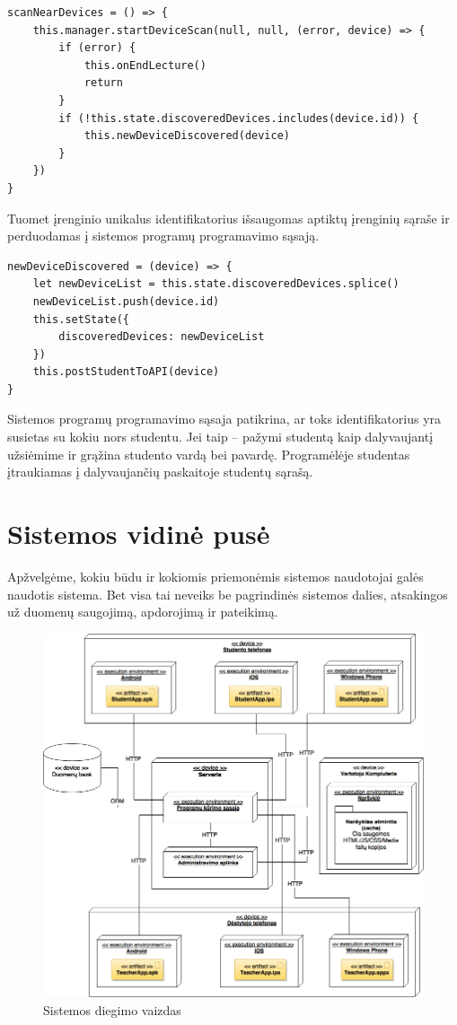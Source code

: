 \documentclass{VUMIFPSbakalaurinis}
\begin{document}
\begin{verbatim}
scanNearDevices = () => {
    this.manager.startDeviceScan(null, null, (error, device) => {
        if (error) {
            this.onEndLecture()
            return
        }
        if (!this.state.discoveredDevices.includes(device.id)) {
            this.newDeviceDiscovered(device)
        }
    })
}
\end{verbatim}

Tuomet įrenginio unikalus identifikatorius išsaugomas aptiktų įrenginių sąraše ir perduodamas į sistemos programų programavimo sąsają.

\begin{verbatim}
newDeviceDiscovered = (device) => {
    let newDeviceList = this.state.discoveredDevices.splice()
    newDeviceList.push(device.id)
    this.setState({
        discoveredDevices: newDeviceList
    })
    this.postStudentToAPI(device)
}
\end{verbatim}

Sistemos programų programavimo sąsaja patikrina, ar toks identifikatorius yra susietas su kokiu nors studentu. Jei taip – pažymi studentą kaip dalyvaujantį užsiėmime ir grąžina studento vardą bei pavardę. Programėlėje studentas įtraukiamas į dalyvaujančių paskaitoje studentų sąrašą.

\section{Sistemos vidinė pusė}

Apžvelgėme, kokiu būdu ir kokiomis priemonėmis sistemos naudotojai galės naudotis sistema. Bet visa tai neveiks be pagrindinės sistemos dalies, atsakingos už duomenų saugojimą, apdorojimą ir pateikimą.

\begin{figure}[H]
	\centering
	\includegraphics[scale=0.5]{img/kursinio_deployment.png}
	\caption{Sistemos diegimo vaizdas}
	\label{img:deployment}
\end{figure}
\end{document}
